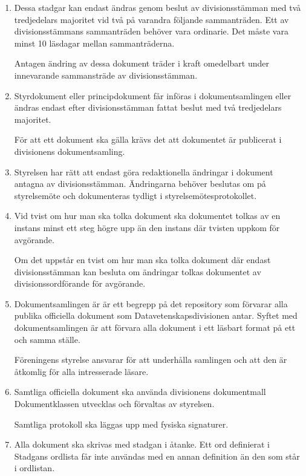 \documentclass{dvd}
\begin{document}
	\begin{enumerate}[label=\arabic* §, ref=\arabic*]
		\item Dessa stadgar kan endast ändras genom beslut av divisionsstämman med två tredjedelars majoritet vid två på varandra följande sammanträden.
		Ett av divisionsstämmans sammanträden behöver vara ordinarie.
		Det måste vara minst 10 läsdagar mellan sammanträderna.

		Antagen ändring av dessa dokument träder i kraft omedelbart under innevarande sammansträde av divisionsstämman.

		\item Styrdokument eller principdokument får införas i dokumentsamlingen eller ändras endast efter divisionsstämman fattat beslut med två tredjedelars majoritet.

		För att ett dokument ska gälla krävs det att dokumentet är publicerat i divisionens dokumentsamling.

		\item Styrelsen har rätt att endast göra redaktionella ändringar i dokument antagna av divisionsstämman.
		Ändringarna behöver beslutas om på styrelsemöte och dokumenteras tydligt i styrelsemötesprotokollet.

		\item Vid tvist om hur man ska tolka dokument ska dokumentet tolkas av en instans minst ett steg högre upp än den instans där tvisten uppkom för avgörande.

		Om det uppstår en tvist om hur man ska tolka dokument där endast divisionsstämman kan besluta om ändringar tolkas dokumentet av divisionssordförande för avgörande.

		\item Dokumentsamlingen är är ett begrepp på det repository som förvarar alla publika officiella dokument som Datavetenskapsdivisionen antar.
		Syftet med dokumentsamlingen är att förvara alla dokument i ett läsbart format på ett och samma ställe.

		Föreningens styrelse ansvarar för att underhålla samlingen och att den är åtkomlig för alla intresserade läsare.
		
		\item Samtliga officiella dokument ska använda divisionens dokumentmall
		Dokumentklassen utvecklas och förvaltas av styrelsen.

		Samtliga protokoll ska läggas upp med fysiska signaturer.
		
		\item Alla dokument ska skrivas med stadgan i åtanke.
		Ett ord definierat i Stadgans ordlista får inte användas med en annan definition än den som står i ordlistan.


\end{enumerate}
\end{document}
